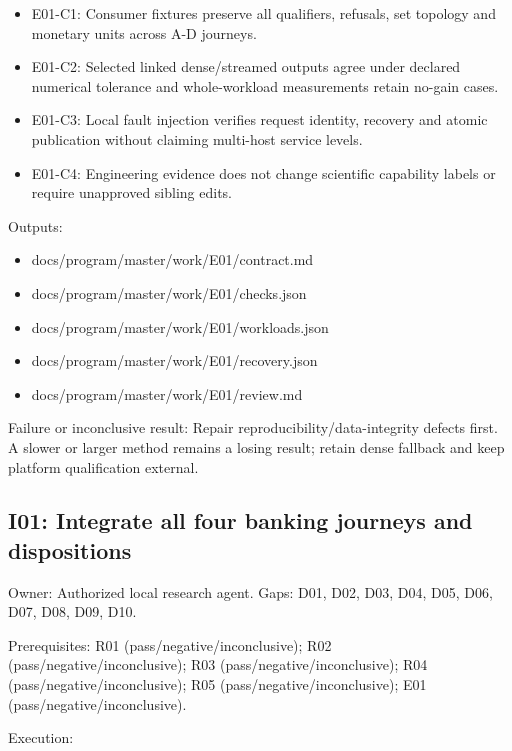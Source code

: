 \documentclass[
  11pt,
  a4paper,
]{article}
\providecommand{\tightlist}{%
  \setlength{\itemsep}{0pt}\setlength{\parskip}{0pt}}
\begin{document}
\begin{itemize}
\tightlist
\item
  E01-C1: Consumer fixtures preserve all qualifiers, refusals, set
  topology and monetary units across A-D journeys.
\item
  E01-C2: Selected linked dense/streamed outputs agree under declared
  numerical tolerance and whole-workload measurements retain no-gain
  cases.
\item
  E01-C3: Local fault injection verifies request identity, recovery and
  atomic publication without claiming multi-host service levels.
\item
  E01-C4: Engineering evidence does not change scientific capability
  labels or require unapproved sibling edits.
\end{itemize}

Outputs:

\begin{itemize}
\tightlist
\item
  docs/program/master/work/E01/contract.md
\item
  docs/program/master/work/E01/checks.json
\item
  docs/program/master/work/E01/workloads.json
\item
  docs/program/master/work/E01/recovery.json
\item
  docs/program/master/work/E01/review.md
\end{itemize}

Failure or inconclusive result: Repair reproducibility/data-integrity
defects first. A slower or larger method remains a losing result; retain
dense fallback and keep platform qualification external.

\hypertarget{i01-integrate-all-four-banking-journeys-and-dispositions}{%
\subsection{I01: Integrate all four banking journeys and
dispositions}\label{i01-integrate-all-four-banking-journeys-and-dispositions}}

Owner: Authorized local research agent. Gaps: D01, D02, D03, D04, D05,
D06, D07, D08, D09, D10.

Prerequisites: R01 (pass/negative/inconclusive); R02
(pass/negative/inconclusive); R03 (pass/negative/inconclusive); R04
(pass/negative/inconclusive); R05 (pass/negative/inconclusive); E01
(pass/negative/inconclusive).

Execution:
\end{document}
